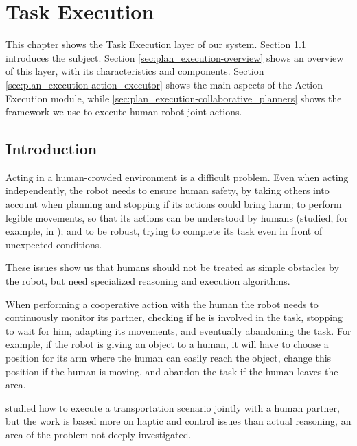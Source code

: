 
\chapter{Task Execution} %

\label{chapter:plan_execution} %


This chapter shows the Task Execution layer of our system. Section \ref{sec:plan_execution-intro} introduces the subject. Section \ref{sec:plan_execution-overview} shows an overview of this layer, with its characteristics and components. Section \ref{sec:plan_execution-action_executor} shows the main aspects of the Action Execution module, while \ref{sec:plan_execution-collaborative_planners} shows the framework we use to execute human-robot joint actions.


\section{Introduction}
\label{sec:plan_execution-intro}
Acting in a human-crowded environment is a difficult problem. Even when acting independently, the robot needs to ensure human safety, by taking others into account when planning and stopping if its actions could bring harm; to perform legible movements, so that its actions can be understood by humans (studied, for example, in \cite{dragan2013legibility}); and to be robust, trying to complete its task even in front of unexpected conditions. 

These issues show us that humans should not be treated as simple obstacles by the robot, but need specialized reasoning and execution algorithms.

When performing a cooperative action with the human the robot needs to continuously monitor its partner, checking if he is involved in the task, stopping to wait for him, adapting its movements, and eventually abandoning the task. For example, if the robot is giving an object to a human, it will have to choose a position for its arm where the human can easily reach the object, change this position if the human is moving, and abandon the task if the human leaves the area.

\cite{bussy2012proactive} studied how to execute a transportation scenario jointly with a human partner, but the work is based more on haptic and control issues than actual reasoning, an area of the problem not deeply investigated.

